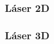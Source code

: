 \begin{frame}
    \frametitle{Láser 2D}

\end{frame}

\begin{frame}
    \frametitle{Láser 3D}

\end{frame}